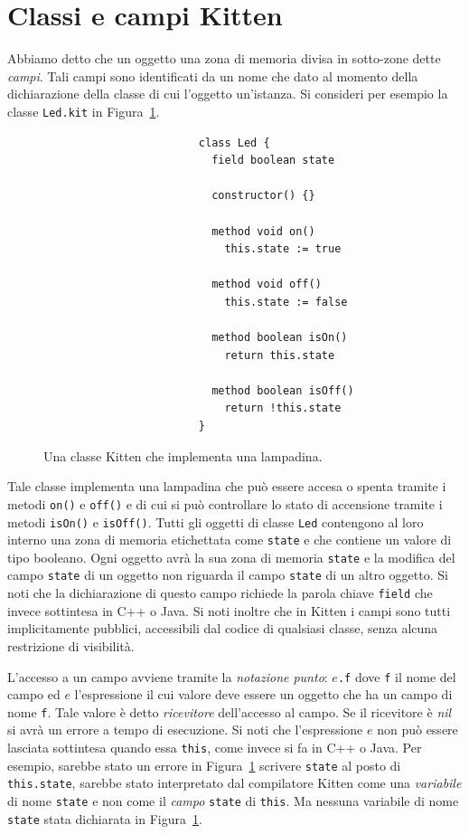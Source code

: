 \section{Classi e campi Kitten}\label{sec:fields}
%
Abbiamo detto che un oggetto \e una zona di memoria divisa in
sotto-zone dette \emph{campi}. Tali campi sono identificati da un nome
che \e dato al momento della dichiarazione della classe di cui l'oggetto
\e un'istanza. Si consideri per esempio la classe \texttt{Led.kit}
in Figura~\ref{fig:led}.
%
\begin{figure}[t]
\begin{verbatim}
                        class Led {
                          field boolean state

                          constructor() {}

                          method void on()
                            this.state := true

                          method void off()
                            this.state := false

                          method boolean isOn()
                            return this.state

                          method boolean isOff()
                            return !this.state
                        }
\end{verbatim}
\caption{Una classe Kitten che implementa una lampadina.}\label{fig:led}
\end{figure}
%
Tale classe implementa una lampadina che pu\`o essere accesa o spenta
tramite i metodi \texttt{on()} e \texttt{off()} e di cui si pu\`o controllare
lo stato di accensione tramite i metodi \texttt{isOn()} e \texttt{isOff()}.
Tutti gli oggetti di classe \texttt{Led} contengono al loro interno
una zona di memoria etichettata come \texttt{state} e che contiene un
valore di tipo booleano. Ogni oggetto avr\`a la sua zona di memoria
\texttt{state} e la modifica del campo \texttt{state} di un oggetto non
riguarda il campo \texttt{state} di un altro oggetto.
Si noti che la dichiarazione di questo campo
richiede la parola chiave \texttt{field} che \e invece sottintesa in C++
o Java. Si noti inoltre che in Kitten i campi sono tutti implicitamente
pubblici, \cioe accessibili dal codice di
qualsiasi classe, senza alcuna restrizione di visibilit\`a.

L'accesso a un campo avviene tramite la \emph{notazione punto}: $e$\texttt{.f}
dove \texttt{f} \e il nome del campo ed $e$ \e l'espressione il cui valore
deve essere un oggetto che ha un campo di nome \texttt{f}. Tale valore
\`e detto \emph{ricevitore} dell'accesso al campo. Se il ricevitore
\`e \textit{nil} si avr\`a un errore a tempo di esecuzione. Si noti
che l'espressione $e$ non pu\`o essere lasciata sottintesa quando
essa \e \texttt{this}, come invece si fa in C++ o Java. Per esempio,
sarebbe stato un errore in Figura~\ref{fig:led} scrivere \texttt{state}
al posto di \texttt{this.state}, \perche sarebbe stato interpretato dal
compilatore Kitten come una \emph{variabile} di nome \texttt{state} e non
come il \emph{campo} \texttt{state} di \texttt{this}. Ma nessuna variabile
di nome \texttt{state} \e stata dichiarata in Figura~\ref{fig:led}.

